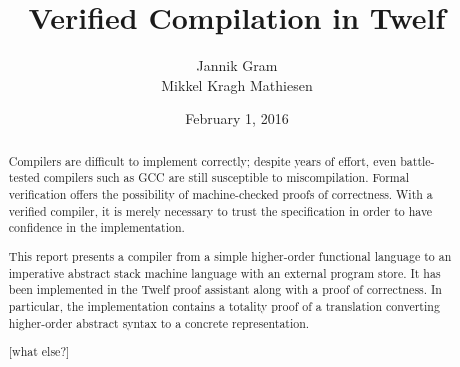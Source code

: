 \title{Verified Compilation in Twelf}
\author{Jannik Gram\\Mikkel Kragh Mathiesen}
\date{February 1, 2016}

\thispagestyle{empty}

\maketitle

\begin{abstract}
Compilers are difficult to implement correctly; despite years of effort, even battle-tested compilers such as GCC are still susceptible to miscompilation.
Formal verification offers the possibility of machine-checked proofs of correctness.
With a verified compiler, it is merely necessary to trust the specification in order to have confidence in the implementation.

This report presents a compiler from a simple higher-order functional language to an imperative abstract stack machine language with an external program store.
It has been implemented in the Twelf proof assistant along with a proof of correctness.
In particular, the implementation contains a totality proof of a translation converting higher-order abstract syntax to a concrete representation.

[what else?]
\end{abstract}

\clearpage

\thispagestyle{empty}

\tableofcontents

\clearpage

